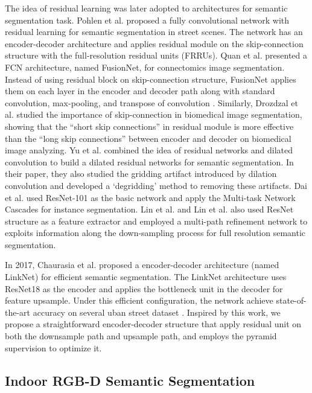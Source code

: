 \documentclass[runningheads]{llncs}
\begin{document}
The idea of residual learning was later adopted to architectures for semantic segmentation task. Pohlen et al. \cite{pohlen2017full} proposed a fully convolutional network with residual learning for semantic segmentation in street scenes. The network has an encoder-decoder architecture and applies residual module on the skip-connection structure with the full-resolution residual units (FRRUs). Quan et al. \cite{quan2016fusionnet} presented a FCN architecture, named FusionNet, for connectomics image segmentation. Instead of using residual block on skip-connection structure, FusionNet applies them on each layer in the encoder and decoder path along with standard convolution, max-pooling, and transpose of convolution \cite{noh2015learning}. Similarly, Drozdzal et al. \cite{drozdzal2016importance} studied the importance of skip-connection in biomedical image segmentation, showing that the ``short skip connections'' in residual module is more effective than the ``long skip connections'' between encoder and decoder on biomedical image analyzing. Yu et al. \cite{yu2017dilated} combined the idea of residual networks and dilated convolution to build a dilated residual networks for semantic segmentation. In their paper, they also studied the gridding artifact introduced by dilation convolution and developed a `degridding' method to removing these artifacts. Dai et al. \cite{dai2016instance} used ResNet-101 as the basic network and apply the Multi-task Network Cascades for instance segmentation. Lin et al. \cite{lin2017refinenet} and Lin et al. \cite{lin2017cascaded} also used ResNet structure as a feature extractor and employed a multi-path refinement network to exploits information along the down-sampling process for full resolution semantic segmentation.

In 2017, Chaurasia et al. \cite{chaurasia2017linknet} proposed a encoder-decoder architecture (named LinkNet) for efficient semantic segmentation. The LinkNet architecture uses ResNet18 as the encoder and applies the bottleneck unit in the decoder for feature upsample. Under this efficient configuration, the network achieve state-of-the-art accuracy on several uban street dataset \cite{cordts2016cityscapes,brostow2008segmentation}. Inspired by this work, we propose a straightforward encoder-decoder structure that apply residual unit on both the downsample path and upsample path, and employs the pyramid supervision to optimize it.

\subsection{Indoor RGB-D Semantic Segmentation}
\end{document}
